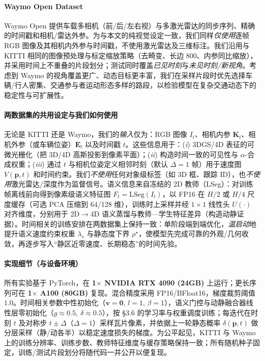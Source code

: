 \documentclass[10pt,conference]{IEEEtran} %
\begin{document}
\paragraph{\textbf{Waymo Open Dataset}}
Waymo Open 提供车载多相机（前/后/左右视）与多激光雷达的同步序列、精确的时间戳和相机/雷达外参。为与本文的纯视觉设定一致，我们同样\emph{仅使用}逐帧 RGB 图像及其相机内外参与时间戳，不使用激光雷达及三维标注。我们沿用与 KITTI 相同的图像预处理与标定缩放策略（去畸变、长边 $800$、内参同比缩放），并采用时间上不重叠的片段划分；测试同时覆盖\emph{已见时刻}与\emph{未见时刻/新视角}。考虑到 Waymo 的视角覆盖更广、动态目标更丰富，我们在采样片段时优先选择车辆/行人密集、交通参与者运动形态多样的路段，以检验模型在复杂交通动态下的稳定性与可扩展性。

\paragraph{\textbf{两数据集的共用设定与我们如何使用}}
无论是 KITTI 还是 Waymo，我们的\emph{输入}仅为：RGB 图像 $I_t$、相机内参 $\mathbf K_t$、相机外参（或车辆位姿）$\mathbf E_t$ 以及时间戳 $t$。这些信息用于：(\emph{i}) 3DGS/4D 表征的可微光栅化（把 3D/4D 高斯投影到像素平面）；(\emph{ii}) 构造时间一致的可见性与 $\alpha$-合成权重；(\emph{iii}) 通过 $t$ 与相机位姿定义相邻时刻（默认 $\Delta{=}1$ 帧）用于速度图 $V(\mathbf p,t)$ 和时间约束。我们\emph{不使用}任何对象级标签（如 3D 框、跟踪 ID），也\emph{不使用}激光雷达/深度作为监督信号。语义信息来自冻结的 2D 教师（LSeg）：对训练帧离线前向得到像素级语义特征图 $F_t=\mathrm{LSeg}(I_t)$，以 FP16 在 $H/2$ 或 $H/4$ 尺度缓存（可选 PCA 压缩到 64/128 维），训练时上采样并经 $1{\times}1$ 线性头 $U(\cdot)$ 对齐维度，分别用于 2D$\to$4D 语义蒸馏与教师—学生特征差异（构造动静证据）。时间相关的训练安排在两数据集上保持一致：单阶段端到端优化，\emph{温启动}地提升语义速度约束权重 $\lambda_v$ 与静态度下界 $\rho^\star$，使模型先完成可靠的外观/几何收敛，再逐步写入“静区近零速度、长期稳态”的时间先验。

\paragraph{\textbf{实现细节（与设备环境）}}
所有实验基于 PyTorch，在 \textbf{1$\times$ NVIDIA RTX 4090 (24GB)} 上运行；更长序列可在 \textbf{1$\times$ A100 (80GB)} 复现。混合精度采用 FP16/BFloat16，梯度裁剪阈值 $1.0$。时间相关参数中性初始化（$\bm v{=}\bm 0,\,l{=}1,\,\beta{=}1$），语义门控与动静融合器线性层零初始化（$g\!\approx\!0.5,\ \delta\!\approx\!0.5$），按 §3.6 的学习率与权重调度训练；每迭代在时刻 $t$ 及对称步 $t\pm\Delta$（$\Delta{=}1$）采样瓦片像素，并依据上一轮静态概率 $\delta(\mathbf p,t)$ 做分层采样（静/动各半）以稳定速度损失的梯度。为公平起见，KITTI 与 Waymo 上的训练分辨率、训练步数、教师特征维度与缓存策略保持一致；所有随机种子固定，训练/测试片段划分将随代码一并公开以便复现。
\end{document}
